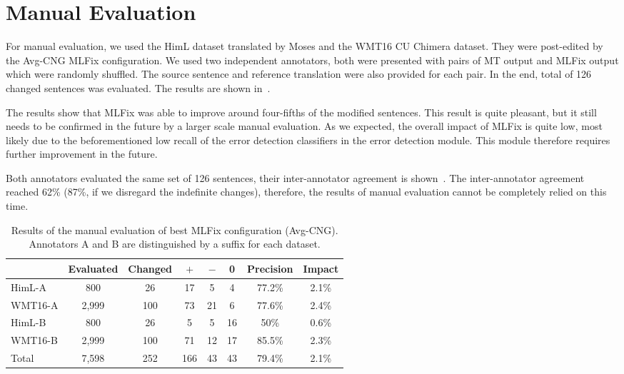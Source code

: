 \section{Manual Evaluation}

For manual evaluation, we used the HimL dataset translated by Moses and the WMT16 CU Chimera dataset.
They were post-edited by the Avg-CNG MLFix configuration.
We used two independent annotators, both were presented with pairs
of MT output and MLFix output which were randomly shuffled. The source sentence and reference translation were also provided for each pair.
In the end, total of 126 changed sentences was evaluated. The results are shown in~.

The results show that MLFix was able to improve around four-fifths of the modified sentences. This
result is quite pleasant, but it still needs to be confirmed in the future by a larger scale manual
evaluation. As we expected, the overall impact of MLFix is quite low, most likely due to the beforementioned
low recall of the error detection classifiers in the error detection module.
This module therefore requires further improvement in the future.

Both annotators evaluated the same set of 126 sentences, their inter-annotator agreement is shown~.
The inter-annotator agreement reached 62\% (87\%, if we disregard the indefinite changes),
therefore, the results of manual evaluation cannot be completely relied on this time.

\begin{table*}[t]
\centering
\small

\begin{tabular}{l|cc|ccc|cc}
  &  Evaluated  &  Changed  &  $+$  &  $-$  &  0  &  Precision  &  Impact  \\
\hline
HimL-A  &  800  &  26  &  17  &  5  &  4  &  77.2\%  &  2.1\%  \\
WMT16-A  &  2,999  &  100  &  73  &  21  &  6  &  77.6\%  &  2.4\%  \\
HimL-B  &  800  &  26  &  5  &  5  &  16  &  50\%  &  0.6\%  \\
WMT16-B  &  2,999  &  100  &  71  &  12  &  17  &  85.5\%  &  2.3\%  \\
\hline
Total &  7,598  &  252  &  166  &  43  &  43  &  79.4\%  &  2.1\%  \\
\end{tabular}
\caption[Czech MLFix manual evaluation]{
Results of the manual evaluation of best MLFix configuration (Avg-CNG). Annotators
A and B are distinguished by a suffix for each dataset.
}
\label{maneval-final}
\end{table*}


